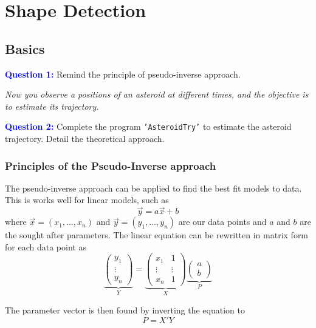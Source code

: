 \section{Shape Detection}
\label{sec:shape_detection}

\subsection{Basics}

\textbf{\textcolor{blue}{Question 1:}} Remind the principle of pseudo-inverse approach.

\textit{Now you observe a positions of an asteroid at different times, and the objective is to estimate its trajectory.}

\textbf{\textcolor{blue}{Question 2:}} Complete the program \texttt{'AsteroidTry'} to estimate the asteroid trajectory. Detail the theoretical approach.

\subsubsection{Principles of the Pseudo-Inverse approach}

The pseudo-inverse approach can be applied to find the best fit models to data. This is works well for linear models, such as 
\begin{equation}
    \Vec{y} = a \vec{x} + b 
\end{equation}
where $\vec{x} = (x_1, \dots, x_n)$ and $\vec{y} = (y_1, \dots, y_n)$ are our data points and $a$ and $b$ are the sought after parameters. The linear equation can be rewritten in matrix form for each data point as
\begin{equation}
    \underbrace{\begin{pmatrix}
        y_1 \\
        \vdots \\
        y_n
    \end{pmatrix}}_{Y}
    =
    \underbrace{\begin{pmatrix}
        x_1 & 1 \\
        \vdots & \vdots \\
        x_n & 1
    \end{pmatrix}}_{X}
    \underbrace{\begin{pmatrix}
        a \\ b
    \end{pmatrix}}_{P}
\end{equation}

The parameter vector is then found by inverting the equation to 
\begin{equation}
    P = X' Y 
\end{equation}

